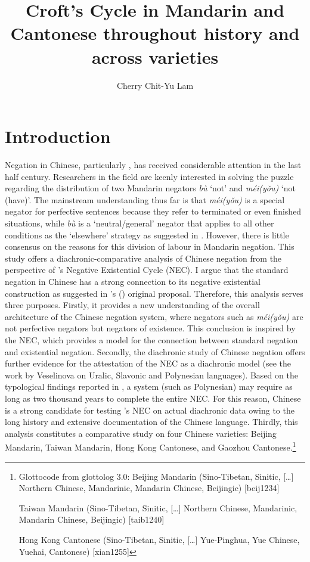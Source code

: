 \documentclass[output=paper]{langscibook}
\author{Cherry Chit-Yu Lam \affiliation{University of Cambridge}}
\title{Croft's Cycle in Mandarin and Cantonese throughout history and across varieties}
\begin{document}
\maketitle

\section{Introduction}\label{s:lam1}

Negation in Chinese, particularly , has received considerable attention in the last half century. Researchers in the field are keenly interested in solving the puzzle regarding the distribution of two Mandarin negators \textit{bù} `not' and \textit{méi(yǒu)} `not (have)'. The mainstream understanding thus far is that \textit{méi(yǒu)} is a special negator for perfective sentences because they refer to terminated or even finished situations, while \textit{bù} is a `neutral/general' negator that applies to all other conditions as the `elsewhere' strategy as suggested in \cite{LiThompson1981}. However, there is little consensus on the reasons for this division of labour in Mandarin negation. This study offers a diachronic-comparative analysis of Chinese negation from the perspective of \citeauthor{Croft1991}'s Negative Existential Cycle (NEC). I argue that the standard negation in Chinese has a strong connection to its negative existential construction as suggested in \citeauthor{Croft1991}'s (\citeyear{Croft1991}) original proposal. Therefore, this analysis serves three purposes. Firstly, it provides a new understanding of the overall architecture of the Chinese negation system, where negators such as \textit{méi(yǒu)} are not perfective negators but negators of existence. This conclusion is inspired by the NEC, which provides a model for the connection between standard negation and existential negation. Secondly, the diachronic study of Chinese negation offers further evidence for the attestation of the NEC as a diachronic model (see the work by Veselinova on Uralic, Slavonic and Polynesian languages). Based on the typological findings reported in \cite{Veselinova2014}, a system (such as Polynesian) may require as long as two thousand years to complete the entire NEC. For this reason, Chinese is a strong candidate for testing \citeauthor{Croft1991}'s NEC on actual diachronic data owing to the long history and extensive documentation of the Chinese language. Thirdly, this analysis constitutes a comparative study on four Chinese varieties: Beijing Mandarin, Taiwan Mandarin, Hong Kong Cantonese, and Gaozhou Cantonese.\footnote{Glottocode from glottolog 3.0: Beijing Mandarin (Sino-Tibetan, Sinitic, […] Northern Chinese, Mandarinic, Mandarin Chinese, Beijingic) [beij1234]

Taiwan Mandarin (Sino-Tibetan, Sinitic, […] Northern Chinese, Mandarinic, Mandarin Chinese, Beijingic) [taib1240]

Hong Kong Cantonese (Sino-Tibetan, Sinitic, […] Yue-Pinghua, Yue Chinese, Yuehai, Cantonese) [xian1255]} 
\end{document}
